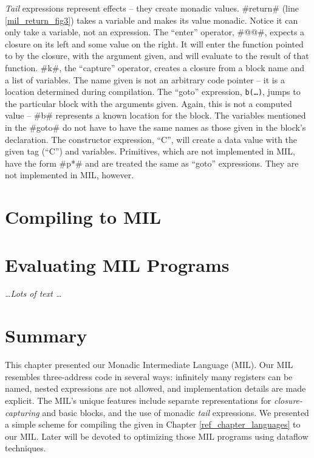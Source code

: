 \documentclass[12pt]{report}
\begin{document}
\emph{Tail} expressions represent effects -- they create monadic
values. #return# (line \ref{mil_return_fig3}) takes a variable and
makes its value monadic. Notice it can only take a variable, not an
expression.  The ``enter'' operator, #@@#, expects a closure on its
left and some value on the right. It will enter the function pointed
to by the closure, with the argument given, and will evaluate to the
result of that function. #k#, the ``capture'' operator, creates a
closure from a block name and a list of variables. The name given is
not an arbitrary code pointer -- it is a location determined during
compilation. The ``goto'' expression, \texttt{b(\dots)}, jumps to the
particular block with the arguments given. Again, this is not a
computed value -- #b# represents a known location for the block. The
variables mentioned in the #goto# do not have to have the same names
as those given in the block's declaration. The constructor expression,
``C'', will create a data value with the given tag (``C'') and
variables. Primitives, which are not implemented in MIL, have the form
#p*# and are treated the same as ``goto'' expressions. They are not 
implemented in MIL, however. 

\section{Compiling \lamA to MIL}
\label{mil_sec4}



\section{Evaluating MIL Programs}
\label{mil_sec5}

\emph{\dots Lots of text \dots}



\section{Summary}
\label{mil_sec6}

This chapter presented our Monadic Intermediate Language (MIL). Our
MIL resembles three-address code in several ways: infinitely many
registers can be named, nested expressions are not allowed, and
implementation details are made explicit. The MIL's unique features
include separate representations for \emph{closure-capturing} and
basic blocks, and the use of monadic \emph{tail} expressions. We 
presented a simple scheme for compiling the \lamA given in
Chapter \ref{ref_chapter_languages} to our MIL. Later will be devoted
to optimizing those MIL programs using dataflow techniques.
\end{document}
